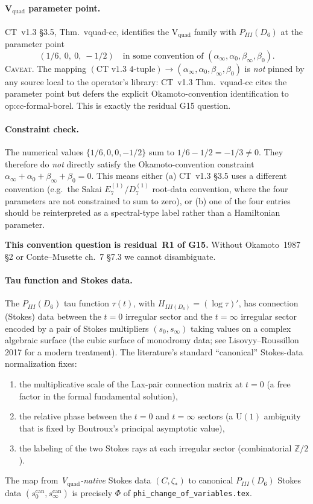 \paragraph{V$_\mathrm{quad}$ parameter point.}
CT~v1.3 §3.5, \textsf{Thm.~vquad-cc}, identifies the
V$_\mathrm{quad}$ family with $P_{III}(D_6)$ at the parameter
point
\[
  (1/6,\ 0,\ 0,\ -1/2)
  \quad\text{in some convention of }
  (\alpha_\infty,\alpha_0,\beta_\infty,\beta_0).
\]
\textsc{Caveat.} The mapping
$(\text{CT v1.3 4-tuple})\to(\alpha_\infty,\alpha_0,\beta_\infty,\beta_0)$
is \emph{not} pinned by any source local to the operator's
library: CT~v1.3 \textsf{Thm.~vquad-cc} cites the parameter
point but defers the explicit Okamoto-convention
identification to \textsf{op:cc-formal-borel}. This is exactly
the residual G15 question.

\paragraph{Constraint check.}
The numerical values $\{1/6, 0, 0, -1/2\}$ sum to
$1/6 - 1/2 = -1/3 \neq 0$. They therefore do \emph{not}
directly satisfy the Okamoto-convention constraint
$\alpha_\infty+\alpha_0+\beta_\infty+\beta_0=0$. This means
either (a) CT~v1.3 §3.5 uses a different convention (e.g.\
the Sakai $E_7^{(1)}/D_7^{(1)}$ root-data convention, where
the four parameters are not constrained to sum to zero), or
(b) one of the four entries should be reinterpreted as a
spectral-type label rather than a Hamiltonian parameter.

\textbf{This convention question is residual~R1 of G15.}
Without Okamoto~1987 §2 or Conte--Musette ch.~7 §7.3 we cannot
disambiguate.

\paragraph{Tau function and Stokes data.}
The $P_{III}(D_6)$ tau function $\tau(t)$, with
$H_{III(D_6)} = (\log\tau)'$, has connection (Stokes) data
between the $t=0$ irregular sector and the $t=\infty$
irregular sector encoded by a pair of Stokes multipliers
$(s_0, s_\infty)$ taking values on a complex algebraic surface
(the cubic surface of monodromy data; see Lisovyy--Roussillon
2017 for a modern treatment). The literature's standard
``canonical'' Stokes-data normalization fixes:
\begin{enumerate}
  \item the multiplicative scale of the Lax-pair connection
        matrix at $t=0$ (a free factor in the formal
        fundamental solution),
  \item the relative phase between the $t=0$ and $t=\infty$
        sectors (a $\mathrm{U}(1)$ ambiguity that is fixed by
        Boutroux's principal asymptotic value),
  \item the labeling of the two Stokes rays at each irregular
        sector (combinatorial $\mathbb{Z}/2$).
\end{enumerate}
The map from \emph{V$_\mathrm{quad}$-native} Stokes data
$(C, \zeta_*)$ to canonical $P_{III}(D_6)$ Stokes data
$(s_0^{\mathrm{can}}, s_\infty^{\mathrm{can}})$ is precisely
$\Phi$ of \texttt{phi\_change\_of\_variables.tex}.
